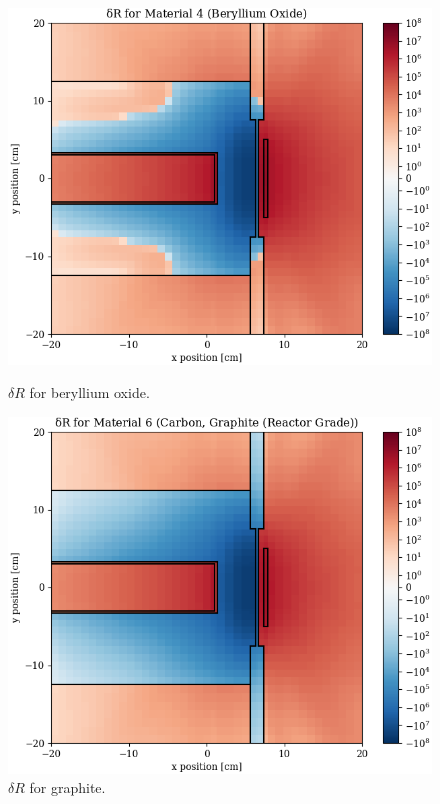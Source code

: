 \begin{figure}
  \begin{minipage}{0.49\linewidth}
    \centering
    \includegraphics[width=\linewidth]{content/testprob/dR_04.png}
    \caption{$\delta R$ for beryllium oxide.}
    \label{fig:testprob:dR_04}
  \end{minipage}
  \hfill
  \begin{minipage}{0.49\linewidth}
    \centering
    \includegraphics[width=\linewidth]{content/testprob/dR_06.png}
    \caption{$\delta R$ for graphite.}
    \label{fig:testprob:dR_06}
  \end{minipage}
\end{figure}


